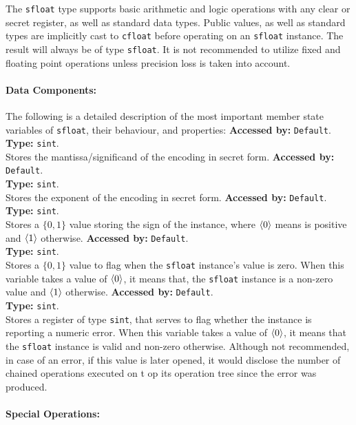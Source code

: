 The \verb|sfloat| type supports basic arithmetic and logic operations with
any clear or secret register, as well as standard data types.
Public values, as well as standard types are implicitly cast to \verb|cfloat|
before operating on an \verb|sfloat| instance. The result will always be of type \verb|sfloat|.
It is not recommended to utilize fixed and floating point operations unless
precision loss is taken into account.

\paragraph{Data Components:}
The following is a detailed description of the most important member state variables of \verb|sfloat|, their behaviour, and properties:
\textbf{Accessed by:} \verb|Default|.\\
\textbf{Type:} \verb|sint|.\\
Stores the mantissa/significand of the encoding in secret form.
\textbf{Accessed by:} \verb|Default|.\\
\textbf{Type:} \verb|sint|.\\
Stores the exponent of the encoding in secret form.
\textbf{Accessed by:} \verb|Default|.\\
\textbf{Type:} \verb|sint|.\\
Stores a $\{0,1\}$ value storing the sign of the instance, where $\langle 0 \rangle$ means is positive and $\langle 1 \rangle$ otherwise.
\textbf{Accessed by:} \verb|Default|.\\
\textbf{Type:} \verb|sint|.\\
Stores a $\{0,1\}$ value to flag when the \verb|sfloat| instance's value is zero.
When this variable takes a value of $\langle 0 \rangle$, it means that, the \verb|sfloat| instance is a non-zero value and $\langle 1 \rangle$ otherwise.
\textbf{Accessed by:} \verb|Default|.\\
\textbf{Type:} \verb|sint|.\\
Stores a register of type \verb|sint|,
that serves to flag whether the instance is reporting a numeric error.
When this variable takes a value of $\langle 0 \rangle$,
it means that the \verb|sfloat| instance is valid and non-zero otherwise.
Although not recommended,
in case of an error, if this value is later opened,
it would disclose the number of chained operations executed on t
op its operation tree since the error was produced.

\paragraph{Special Operations:}

